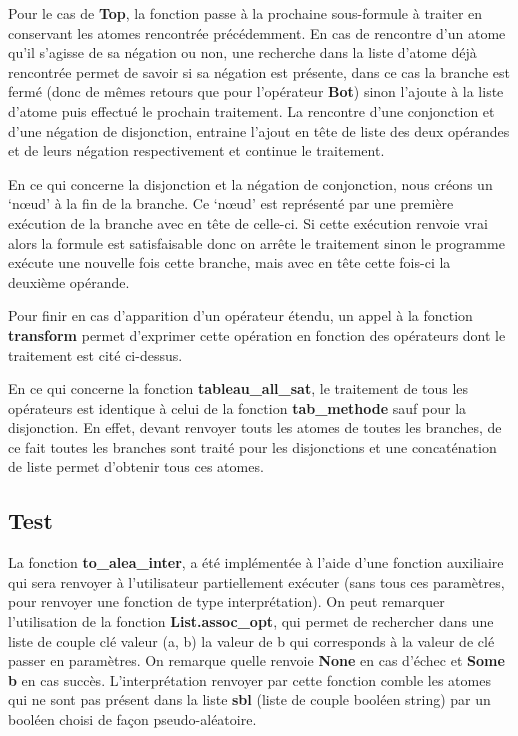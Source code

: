 \documentclass[12pt]{article}
\begin{document}
    Pour le cas de \textbf{Top}, la fonction passe à la prochaine sous-formule à
    traiter en conservant les atomes rencontrée précédemment. En cas de rencontre 
    d'un atome qu'il s'agisse de sa négation ou non, une recherche dans la liste d'atome
    déjà rencontrée permet de savoir si sa négation est présente, dans ce cas 
    la branche est fermé (donc de mêmes retours que pour l'opérateur \textbf{Bot})
    sinon l'ajoute à la liste d'atome puis effectué le prochain traitement. La 
    rencontre d'une conjonction et d'une négation de disjonction, entraine 
    l'ajout en tête de liste des deux opérandes et de leurs négation 
    respectivement et continue le traitement.

    En ce qui concerne la disjonction et la négation de conjonction, nous créons 
    un `nœud' à la fin de la branche. Ce `nœud' est représenté par une première
    exécution de la branche avec en tête de celle-ci. Si cette exécution renvoie
    vrai alors la formule est satisfaisable donc on arrête le traitement sinon le 
    programme exécute une nouvelle fois cette branche, mais avec en tête cette 
    fois-ci la deuxième opérande. 

    Pour finir en cas d'apparition d'un opérateur étendu, un appel à la fonction 
    \textbf{transform} permet d'exprimer cette opération en fonction des opérateurs
    dont le traitement est cité ci-dessus.

    En ce qui concerne la fonction \textbf{tableau\_all\_sat}, le traitement de 
    tous les opérateurs est identique à celui de la fonction \textbf{tab\_methode}
    sauf pour la disjonction. En effet, devant renvoyer touts les atomes de toutes 
    les branches, de ce fait toutes les branches sont traité pour les disjonctions
    et une concaténation de liste permet d'obtenir tous ces atomes.

    \subsection{Test}

    La fonction \textbf{to\_alea\_inter}, a été implémentée à l'aide d'une 
    fonction auxiliaire qui sera renvoyer à l'utilisateur partiellement 
    exécuter (sans tous ces paramètres, pour renvoyer une fonction de type 
    interprétation). On peut remarquer l'utilisation de la fonction 
    \textbf{List.assoc\_opt}, qui permet de rechercher dans une liste de couple 
    clé valeur (a, b) la valeur de b qui corresponds à la valeur de clé passer en 
    paramètres. On remarque quelle renvoie \textbf{None} en cas d'échec et 
    \textbf{Some b} en cas succès. L'interprétation renvoyer par cette fonction 
    comble les atomes qui ne sont pas présent dans la liste \textbf{sbl} (liste 
    de couple booléen string) par un booléen choisi de façon pseudo-aléatoire.
\end{document}
